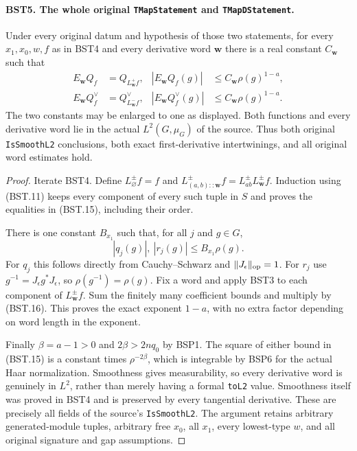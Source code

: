 \documentclass[11pt,a4paper]{article}
\numberwithin{equation}{section}
\theoremstyle{remark}\newtheorem{remark}[theorem]{Remark}
\begin{document}
\paragraph{BST5. The whole original \texttt{TMap\allowbreak Statement} and \texttt{TMap\allowbreak DStatement}.}
\label{claim:BST5}
Under every original datum and hypothesis of those two statements,
for every $x_1,x_0,w,f$ as in BST4 and every derivative word
$\mathbf w$ there is a real constant $C_{\mathbf w}$ such that
\[
 \begin{aligned}
 E_{\mathbf w}Q_f&=Q_{L_{\mathbf w}^{+}f},
 &|E_{\mathbf w}Q_f(g)|&\le C_{\mathbf w}\rho(g)^{1-a},\\
 E_{\mathbf w}Q_f^\vee&=Q_{L_{\mathbf w}^{-}f}^\vee,
 &|E_{\mathbf w}Q_f^\vee(g)|&\le C_{\mathbf w}\rho(g)^{1-a}.
 \end{aligned}
 \tag{BST.15}
\]
The two constants may be enlarged to one as displayed.
Both functions and every derivative word lie in the actual
$L^2(G,\mu_G)$ of the source.  Thus both original
\texttt{Is\allowbreak Smooth\allowbreak L2} conclusions, both exact first-derivative
intertwinings, and all original word estimates hold.

\begin{proof}
Iterate BST4.  Define
$L_\varnothing^\pm f=f$ and
$L_{(a,b)::\mathbf w}^\pm f=L_{ab}^\pm L_{\mathbf w}^\pm f$.
Induction using (BST.11) keeps every component of every such tuple
in $S$ and proves the equalities in (BST.15), including their order.

There is one constant $B_{x_1}$ such that, for all $j$ and $g\in G$,
\[
                    |q_j(g)|,\ |r_j(g)|\le B_{x_1}\rho(g).
 \tag{BST.16}
\]
For $q_j$ this follows directly from Cauchy--Schwarz and
$\|J_\epsilon\|_{\rm op}=1$.  For $r_j$ use
$g^{-1}=J_\epsilon g^*J_\epsilon$, so
$\rho(g^{-1})=\rho(g)$.
Fix a word and apply BST3 to each component of
$L_{\mathbf w}^\pm f$.  Sum the finitely many coefficient bounds
and multiply by (BST.16).  This proves the exact exponent $1-a$,
with no extra factor depending on word length in the exponent.

Finally $\beta=a-1>0$ and $2\beta>2nq_0$ by BSP1.
The square of either bound in (BST.15) is a constant times
$\rho^{-2\beta}$, which is integrable by BSP6 for the actual Haar
normalization.  Smoothness gives measurability, so every derivative
word is genuinely in $L^2$, rather than merely having a formal
\texttt{to\allowbreak L2} value.  Smoothness itself was proved in BST4 and is
preserved by every tangential derivative.  These are precisely all
fields of the source's \texttt{Is\allowbreak Smooth\allowbreak L2}.
The argument retains arbitrary generated-module tuples, arbitrary
free $x_0$, all $x_1$, every lowest-type $w$, and all original
signature and gap assumptions.
\end{proof}
\end{document}
